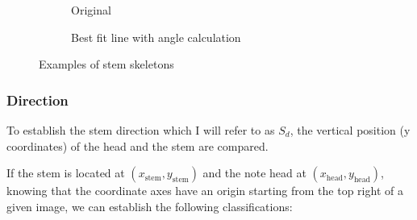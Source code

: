 \begin{figure}[h!]
    \centering

    \begin{subfigure}[b]{.45\linewidth}
        \centering
        \caption{Original}
    \end{subfigure}
    \begin{subfigure}[b]{.45\linewidth}
        \centering
        \caption{Best fit line with angle calculation}
    \end{subfigure}

    \caption{Examples of stem skeletons}
    \label{fig:stem-skeletons}
\end{figure}




\subsubsection{Direction}

To establish the stem direction which I will refer to as $S_d$, the vertical position (y coordinates) of the head and the stem are compared.

If the stem is located at $(x_{\text{stem}}, y_{\text{stem}})$ and the note head at $(x_{\text{head}}, y_{\text{head}})$, knowing that the coordinate axes have an origin starting from the top right of a given image, we can establish the following classifications:

